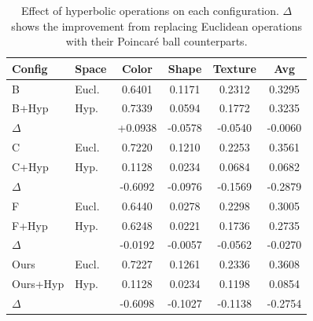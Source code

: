 \begin{table}[t]
\centering
\caption{Effect of hyperbolic operations on each configuration. $\Delta$ shows the improvement from replacing Euclidean operations with their Poincar\'{e} ball counterparts.}
\label{tab:hyperbolic_comparison}
\begin{tabular}{l|l|ccc|c}
\toprule
Config & Space & Color & Shape & Texture & Avg \\
\midrule
B & Eucl. & 0.6401 & 0.1171 & 0.2312 & 0.3295 \\
B+Hyp & Hyp. & 0.7339 & 0.0594 & 0.1772 & 0.3235 \\
$\Delta$ &  & +0.0938 & -0.0578 & -0.0540 & -0.0060 \\
\midrule
C & Eucl. & 0.7220 & 0.1210 & 0.2253 & 0.3561 \\
C+Hyp & Hyp. & 0.1128 & 0.0234 & 0.0684 & 0.0682 \\
$\Delta$ &  & -0.6092 & -0.0976 & -0.1569 & -0.2879 \\
\midrule
F & Eucl. & 0.6440 & 0.0278 & 0.2298 & 0.3005 \\
F+Hyp & Hyp. & 0.6248 & 0.0221 & 0.1736 & 0.2735 \\
$\Delta$ &  & -0.0192 & -0.0057 & -0.0562 & -0.0270 \\
\midrule
Ours & Eucl. & 0.7227 & 0.1261 & 0.2336 & 0.3608 \\
Ours+Hyp & Hyp. & 0.1128 & 0.0234 & 0.1198 & 0.0854 \\
$\Delta$ &  & -0.6098 & -0.1027 & -0.1138 & -0.2754 \\
\bottomrule
\end{tabular}
\end{table}